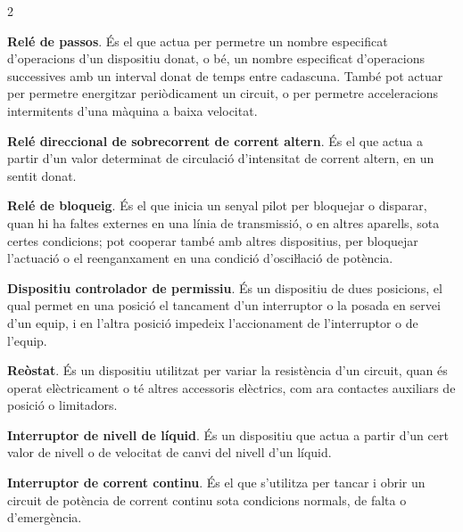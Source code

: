 \begin{multicols}{2}
\begin{list}{}
		\item[\textbf{66}]   
		\textbf{Relé de passos}. És el que actua per permetre un nombre especificat d'operacions d'un dispositiu
		donat, o bé, un nombre especificat d'operacions successives amb un
		interval donat de temps entre cadascuna. També pot actuar per
		permetre energitzar periòdicament un circuit, o per permetre acceleracions intermitents d'una
		màquina a baixa velocitat.
		
		\item[\textbf{67}]  
		\textbf{Relé direccional de sobrecorrent de corrent altern}. És
		el que actua a partir d'un valor determinat de circulació
		d'intensitat de corrent altern, en un sentit donat.
		
		\item[\textbf{68}]   
		\textbf{Relé de bloqueig}. És el que inicia un senyal pilot per bloquejar o disparar, quan hi ha faltes externes en
		una línia de transmissió, o en altres aparells, sota certes
		condicions; pot cooperar també amb altres dispositius, per
		bloquejar l'actuació o el reenganxament en una condició
		d'osciŀlació de potència.
		
		\item[\textbf{69}]   
		\textbf{Dispositiu controlador de permissiu}. És
		un dispositiu  de dues posicions, el qual permet en una posició el tancament d'un
		interruptor o la posada en servei d'un equip, i en l'altra posició
		impedeix l'accionament de l'interruptor o de l'equip.
		
		\item[\textbf{70}]   
		\textbf{Reòstat}. És un dispositiu utilitzat per
		variar la resistència d'un circuit, quan és operat elèctricament o té altres accessoris elèctrics, com ara contactes auxiliars de posició o limitadors.
		
		\item[\textbf{71}]   
		\textbf{Interruptor de nivell de líquid}. És un dispositiu que actua a partir d'un cert valor de nivell o de velocitat de canvi del nivell d'un líquid.
		
		\item[\textbf{72}]   
		\textbf{Interruptor de corrent continu}. És el que s'utilitza per tancar i obrir un circuit de potència de corrent continu
		sota condicions normals, de falta o d'emergència.
		

\end{list}
\end{multicols}
